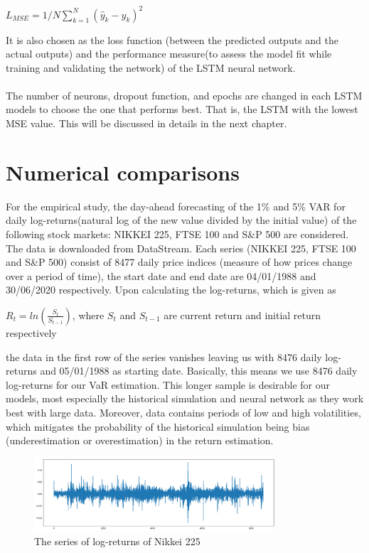 \documentclass[a4paper,11pt,oneside]{book}
\begin{document}
\begin{center}
	$L_{MSE} = 1/N\sum_{k=1}^{N} ({\hat{y}}_{k}-y_k)^2$
\end{center}
It is also chosen as the loss function (between the predicted outputs and the actual outputs) and the performance measure(to assess the model fit while
training and validating the network) of the
LSTM neural network.\\\\
The number of neurons, dropout function, and epochs are changed in each LSTM models to choose the one that performs best. That is, the LSTM with the lowest MSE value. This will be discussed in details in the next chapter.


\chapter{Numerical comparisons}
For the empirical study, the day-ahead forecasting of the 1\% and 5\% VAR for daily log-returns(natural log of the new value divided by the initial value) of the following stock markets: NIKKEI 225, FTSE 100 and S\&P 500 are considered. The data is downloaded from DataStream. Each series (NIKKEI 225, FTSE 100 and S\&P 500) consist of 8477 daily price indices (measure of how prices change over a period of time), the start date and end date are 04/01/1988 and 30/06/2020 respectively. Upon calculating the log-returns, which is given as 

\begin{center}
	$R_t = ln(\frac{S_t}{S_{t-1}})$, where ${S_t}$ and ${S_{t-1}}$ are current return and initial return respectively
\end{center}
the data in the first row of the series vanishes leaving us with 8476 daily log-returns and 05/01/1988 as starting date. Basically, this means we use 8476 daily log-returns for our VaR estimation. This longer sample is desirable for our models, most especially the historical simulation and neural network as they work best with large data. Moreover, data contains periods of low and high volatilities, which mitigates the probability of the historical simulation being bias (underestimation or overestimation) in the return estimation.\newline

\begin{figure}[!h]
	\centering
	\includegraphics[width=0.8\textwidth]{figures/logNikkei}
	\caption{The series of log-returns of Nikkei 225}
	\label{logNikkei}
\end{figure}
\end{document}
